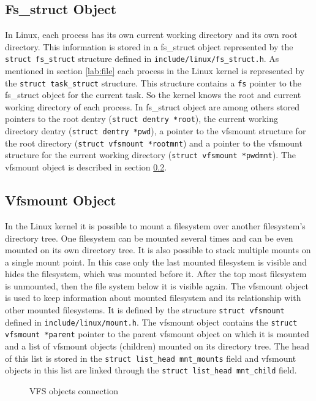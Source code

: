 \subsection{Fs\_struct Object}
In Linux, each process has its own current working directory and its own root
directory. This information is stored in a fs\_struct object represented by the
\texttt{struct fs\_struct} structure defined in \texttt{include/linux/fs\_struct.h}.
As mentioned in section \ref{lab:file} each process in the Linux kernel is
represented by the \texttt{struct task\_struct} structure. This structure
contains a
\texttt{fs} pointer to the fs\_struct object for the current task. So the kernel knows
the root and current working directory of each process. In fs\_struct object are among
others stored pointers to the root dentry (\texttt{struct dentry *root}),
the current working directory dentry (\texttt{struct dentry *pwd}), a pointer to the
vfsmount structure for the root directory (\texttt{struct vfsmount *rootmnt})
and a pointer
to the vfsmount structure for the current working directory (\texttt{struct vfsmount
*pwdmnt}). The vfsmount object is described in section \ref{lab:vfsmount}.

\subsection{Vfsmount Object}
\label{lab:vfsmount}
In the Linux kernel it is possible to mount a filesystem over another filesystem's directory
tree. One filesystem can be mounted several times and can be even mounted on its own
directory tree. It is also possible to stack multiple mounts on a single mount point.
In this case only the last mounted filesystem is visible and hides the filesystem,
which was mounted before it. After the top most filesystem is unmounted, then the file
system below it is visible again. The vfsmount object is used to keep information
about mounted filesystem and its relationship with other mounted filesystems. It is
defined by the structure \texttt{struct vfsmount} defined in
\texttt{include/linux/mount.h}. The vfsmount object contains the \texttt{struct
vfsmount *parent} pointer to the parent vfsmount object on which it is mounted and
a list of vfsmount objects (children) mounted on its directory tree. The head of this list
is stored in the \texttt{struct list\_head mnt\_mounts} field and vfsmount objects in this
list are linked through the \texttt{struct list\_head mnt\_child} field. \\

\begin{figure}[h]
	\begin{center}
		
	\end{center}
	\caption{VFS objects connection}
	\label{fig:vfs_struct}
\end{figure}

